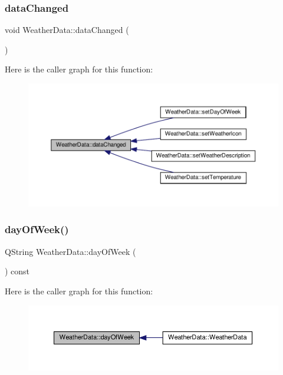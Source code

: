 \subsubsection{\texorpdfstring{data\+Changed}{dataChanged}}
{\footnotesize\ttfamily void Weather\+Data\+::data\+Changed (\begin{DoxyParamCaption}{ }\end{DoxyParamCaption})\hspace{0.3cm}{\ttfamily [signal]}}

Here is the caller graph for this function\+:
\nopagebreak
\begin{figure}[H]
\begin{center}
\leavevmode
\includegraphics[width=350pt]{class_weather_data_a23185106cf22ef8c57c96154e37b24d1_icgraph}
\end{center}
\end{figure}
\mbox{\label{class_weather_data_a413b0ccf3fad036782ee5f5cb66f9a62}} 
\subsubsection{\texorpdfstring{day\+Of\+Week()}{dayOfWeek()}}
{\footnotesize\ttfamily Q\+String Weather\+Data\+::day\+Of\+Week (\begin{DoxyParamCaption}{ }\end{DoxyParamCaption}) const}

Here is the caller graph for this function\+:
\nopagebreak
\begin{figure}[H]
\begin{center}
\leavevmode
\includegraphics[width=350pt]{class_weather_data_a413b0ccf3fad036782ee5f5cb66f9a62_icgraph}
\end{center}
\end{figure}
\mbox{\label{class_weather_data_a0a83b2ee5398eaba062e3c6fe9264a3d}} 
